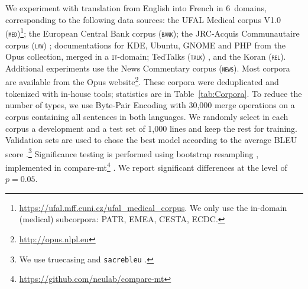 \documentclass[11pt]{article}
\newcommand{\fyDone}[1]{\done[FY]\Todo[FY:]{\textcolor{orange}{#1}}}
\newcommand{\domain}[1]{\texttt{\textsc{#1}}}
\begin{document}
We experiment with translation from English into French in 6~domains, corresponding to the following data sources: the UFAL Medical corpus V1.0 (\domain{med})\footnote{\url{https://ufal.mff.cuni.cz/ufal_medical_corpus}. We only use the in-domain (medical) subcorpora: PATR, EMEA, CESTA, ECDC.}; the European Central Bank corpus (\domain{bank}); the JRC-Acquis Communautaire corpus (\domain{law}) \cite{Steinberger06acquis}; documentations for KDE, Ubuntu, GNOME and PHP from the Opus collection, merged in a \domain{it}-domain; TedTalks (\domain{talk}) \cite{Cettolo12wit}, and the Koran (\domain{rel}). Additional experiments use the News Commentary corpus (\domain{news}). Most corpora are available from the Opus website\footnote{\url{http://opus.nlpl.eu}}. These corpora were deduplicated and tokenized with in-house tools; statistics are in Table~\ref{tab:Corpora}. To reduce the number of types, we use Byte-Pair Encoding \cite{Sennrich16BPE} with 30,000 merge operations on a corpus containing all sentences in both languages.\fyDone{Add \# number of tokens, also specificity ?}%
%
We randomly select in each corpus a development and a test set of 1,000 lines and keep the rest for training. Validation sets are used to chose the best model according to the average BLEU score \cite{Papineni02bleu}.\footnote{We use truecasing and \texttt{sacrebleu} \cite{Post18call}.}\fyDone{A word about meta-parameter settings} Significance testing is performed using bootstrap resampling \cite{Koehn04statistical}, implemented in compare-mt\footnote{\url{https://github.com/neulab/compare-mt}} \cite{Neubig19compare-mt}. We report significant differences at the level of $p=0.05$.\fyDone{Fix correct p value}
\end{document}

